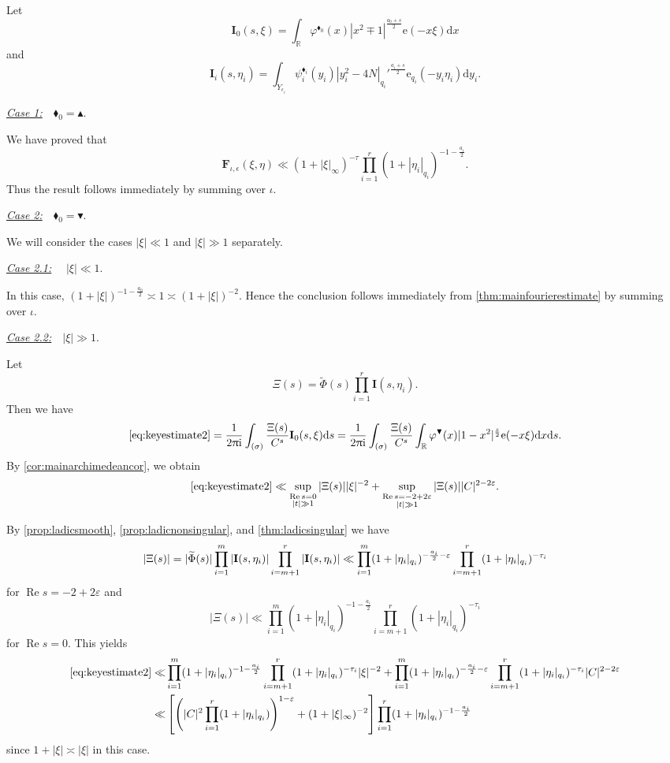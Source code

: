 \documentclass[10pt,oneside,reqno]{amsart}
\makeatletter
\newcommand\rmd{\mathrm{d}}
\newcommand\rme{\mathrm{e}}
\newcommand\rmi{\mathrm{i}}
\newcommand\bF{\mathbf{F}}
\newcommand\bI{\mathbf{I}}
\newcommand\RR{\mathbb{R}}
\newcommand\dpii{2\uppi\rmi}
\renewcommand\Re{\mathop{\mathrm{Re}}}
\theoremstyle{THEOREM}
\theoremstyle{DEFINITION}
\theoremstyle{EXERCISE}
\numberwithin{equation}{section}
\renewenvironment{proof}[1][\proofname]{\par
  \vspace{-6pt}
  \pushQED{\qed}
  \normalfont \topsep6\p@\@plus6\p@\relax
  \trivlist
  \item[\hskip\labelsep\rmfamily\bfseries
    #1\@addpunct{:}]\ignorespaces
}{
  \popQED\endtrivlist\@endpefalse
  \vspace{-6pt}
}
\makeatother
\begin{document}
\begin{proof}[Proof of \autoref{thm:mainfourierestimate2}]
Let
\[
\bI_0(s,\xi)=\int_{\RR}\varphi^{\blacklozenge_0}(x)|x^2\mp 1|^{\frac{a_0+s}{2}}\rme(-x\xi)\rmd x
\]
and
\[
\bI_i(s,\eta_i)=\int_{Y_{\epsilon_i}}\psi_i^{\blacklozenge_i}(y_i)|y_i^2-4N|_{q_i}'^{\frac{a_i+s}{2}}\rme_{q_i}(-y_i\eta_i)\rmd y_i.
\]

\underline{\emph{Case 1:}}\ \ $\blacklozenge_0=\blacktriangle$. 

We have proved that 
\[
  \bF_{\iota,\epsilon}(\xi,\eta) \ll (1+|\xi|_\infty)^{-\tau}\prod_{i=1}^{r}(1+|\eta_i|_{q_i})^{-1-\frac{a_i}{2}}.
\]
Thus the result follows immediately by summing over $\iota$.

\underline{\emph{Case 2:}}\ \ $\blacklozenge_0=\blacktriangledown$. 

We will consider the cases $|\xi|\ll 1$ and $|\xi|\gg 1$ separately.

\underline{\emph{Case 2.1:}} \ \ $|\xi|\ll 1$.

In this case, $(1+|\xi|)^{-1-\frac{a_0}{2}}\asymp 1 \asymp (1+|\xi|)^{-2}$. Hence the conclusion follows immediately from \autoref{thm:mainfourierestimate} by summing over $\iota$.

\underline{\emph{Case 2.2:}}\ \ $|\xi|\gg 1$. 

Let
\[
\Xi(s)=\widetilde{\Phi}(s)\prod_{i=1}^{r}\bI(s,\eta_i).
\]
Then we have
\[
\eqref{eq:keyestimate2}=\frac{1}{\dpii}\int_{(\sigma)}\frac{\Xi(s)}{C^s}\bI_0(s,\xi)\rmd s=
     \frac{1}{\dpii}\int_{(\sigma)}\frac{\Xi(s)}{C^s}\int_{\RR}\varphi^\blacktriangledown(x)|1-x^2|^{\frac s2} \rme(-x\xi)\rmd x\rmd s .
\]
By \autoref{cor:mainarchimedeancor}, we obtain
\[
  \eqref{eq:keyestimate2}  \ll  \sup_{\substack{\Re s=0 \\ |t|\gg 1}}|\Xi(s)||\xi|^{-2}+\sup_{\substack{\Re s=-2+2\varepsilon \\ |t|\gg 1}}|\Xi(s)||C|^{2-2\varepsilon}.
\]

By \autoref{prop:ladicsmooth}, \autoref{prop:ladicnonsingular}, and \autoref{thm:ladicsingular} we have
\[
|\Xi(s)|=|\widetilde{\Phi}(s)|\prod_{i=1}^{m}|\bI(s,\eta_i)|\prod_{i=m+1}^{r}|\bI(s,\eta_i)| \ll \prod_{i=1}^{m}(1+|\eta_i|_{q_i})^{-\frac{a_i}{2}-\varepsilon}\prod_{i=m+1}^{r}(1+|\eta_i|_{q_i})^{-\tau_i}\\
\]
for $\Re s=-2+2\varepsilon$ and
\[
|\Xi(s)|\ll \prod_{i=1}^{m}(1+|\eta_i|_{q_i})^{-1-\frac{a_i}{2}}\prod_{i=m+1}^{r}(1+|\eta_i|_{q_i})^{-\tau_i}
\]
for $\Re s=0$. This yields
\begin{align*}
  \eqref{eq:keyestimate2} 
  \ll  & \prod_{i=1}^{m}(1+|\eta_i|_{q_i})^{-1-\frac{a_i}{2}}\prod_{i=m+1}^{r}(1+|\eta_i|_{q_i})^{-\tau_i}|\xi|^{-2} +\prod_{i=1}^{m}(1+|\eta_i|_{q_i})^{-\frac{a_i}{2}-\varepsilon}\prod_{i=m+1}^{r}(1+|\eta_i|_{q_i})^{-\tau_i}|C|^{2-2\varepsilon}\\
  \ll & \left[\left(|C|^2\prod_{i=1}^{r}(1+|\eta_i|_{q_i})\right)^{1-\varepsilon}+(1+|\xi|_\infty)^{-2}\right] \prod_{i=1}^{r}(1+|\eta_i|_{q_i})^{-1-\frac{a_i}{2}}
\end{align*}
since $1+|\xi|\asymp |\xi|$ in this case.
\end{proof}
\end{document}

